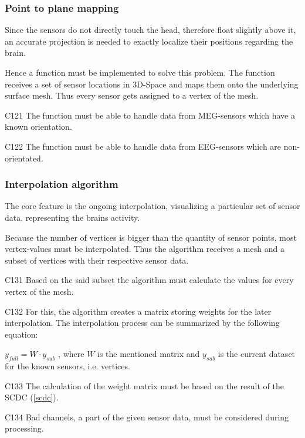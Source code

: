 \subsubsection{Point to plane mapping} \label{projection}

	Since the sensors do not directly touch the head, therefore float slightly above it, an accurate projection is needed to 
	exactly localize their positions regarding the brain. 
	
	Hence a function must be implemented to solve this problem. 
	The function receives a set of sensor locations in 3D-Space and maps them onto the underlying surface mesh. Thus every 			sensor gets assigned to a vertex of the mesh. 

	\begin{aims}
	
		\item[C121] The function must be able to handle data from MEG-sensors which have a known orientation.
		\item[C122] The function must be able to handle data from EEG-sensors which are non-orientated.
	
	\end{aims}

\subsubsection{Interpolation algorithm} \label{interpolation} 

	The core feature is the ongoing interpolation, visualizing a particular set of sensor data, representing the brains 			activity.
	
	Because the number of vertices is bigger than the quantity of sensor points, most vertex-values must be interpolated.
	Thus the algorithm receives a mesh and a subset of vertices with their respective sensor data.  
	
	\begin{aims}
	
		\item[C131] Based on the said subset the algorithm must calculate the values for every vertex of the mesh.
		\item[C132] For this, the algorithm creates a matrix storing weights for the later interpolation.
					The interpolation process can be summarized by the following equation: 
					
					$y_{full} = W \cdot y_{sub}$
					, where $W$ is the mentioned matrix and $y_{sub}$ is the current dataset for the known sensors, i.e. 							vertices.
		\item[C133] The calculation of the weight matrix must be based on the result of the SCDC (\ref{scdc}).
		\item[C134] Bad channels, a part of the given sensor data, must be considered during processing. 
	
	\end{aims}

